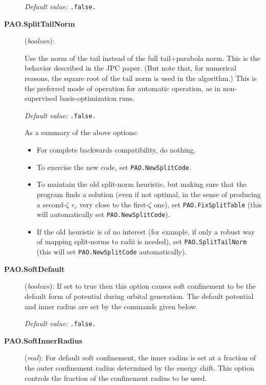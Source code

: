 \documentclass[11pt]{article}
\begin{document}
\begin{description}
{\it Default value:} {\tt .false.}

\item[{\bf PAO.SplitTailNorm}] ({\it boolean}): 

Use the norm of the tail instead of the full tail+parabola
norm. This is the behavior described in the JPC paper. (But note
that, for numerical reasons, the square root of the tail norm is used
in the algorithm.) This is the preferred mode of operation for
automatic operation, as in non-supervised basis-optimization runs.

{\it Default value:} {\tt .false.}

As a summary of the above options:
\begin{itemize}
\item For complete backwards compatibility, do nothing.
\item To exercise the new code, set {\tt PAO.NewSplitCode}.
\item To maintain the old split-norm heuristic, but
making sure that the program finds a solution (even
if not optimal, in the sense of producing a second-$\zeta$ $r_c$
very close to the first-$\zeta$ one), set {\tt PAO.FixSplitTable}
(this will automatically set {\tt PAO.NewSplitCode}).
\item If the old heuristic is of no interest (for example, if
only a robust way of mapping split-norms to radii is needed), set
{\tt PAO.SplitTailNorm} (this will set {\tt PAO.NewSplitCode}
automatically).
\end{itemize}

\item[{\bf PAO.SoftDefault}] ({\it boolean}):
If set to true then this option causes soft confinement to be the
default form
of potential during orbital generation. The default potential and
inner radius
are set by the commands given below.

{\it Default value:} {\tt .false.}

\item[{\bf PAO.SoftInnerRadius}] ({\it real}):
For default soft confinement, the inner radius is set at a fraction of
the outer
confinement radius determined by the energy shift. This option
controls the fraction
of the confinement radius to be used.


\end{description}
\end{document}
